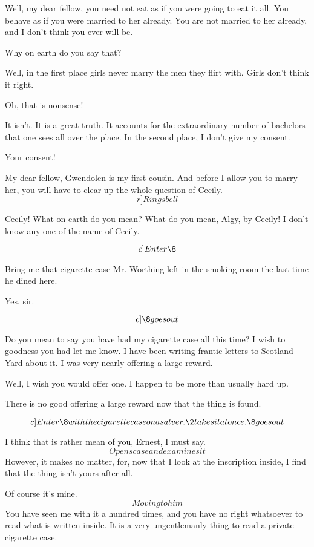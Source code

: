 \documentclass{book}
\begin{document}
\2  Well, my dear fellow, you need not eat as if you were
going to eat it all.  You behave as if you were married to her
already.  You are not married to her already, and I don't think you
ever will be.

\1  Why on earth do you say that?

\2  Well, in the first place girls never marry the men they
flirt with.  Girls don't think it right.

\1  Oh, that is nonsense!

\2  It isn't.  It is a great truth.  It accounts for the
extraordinary number of bachelors that one sees all over the place.
In the second place, I don't give my consent.

\1  Your consent!

\2  My dear fellow, Gwendolen is my first cousin.  And
before I allow you to marry her, you will have to clear up the
whole question of Cecily.  \[r]Rings bell\]

\1  Cecily!  What on earth do you mean?  What do you mean, Algy,
by Cecily!  I don't know any one of the name of Cecily.

\[c]Enter \8\]

\2  Bring me that cigarette case Mr. Worthing left in the
smoking-room the last time he dined here.

\8  Yes, sir.

\[c]\8 goes out\]

\1  Do you mean to say you have had my cigarette case all this
time?  I wish to goodness you had let me know.  I have been writing
frantic letters to Scotland Yard about it.  I was very nearly
offering a large reward.

\2  Well, I wish you would offer one.  I happen to be more
than usually hard up.

\1  There is no good offering a large reward now that the thing
is found.

\[c]Enter \8 with the cigarette case on a salver. \\\2 takes it
at once.  \8 goes out\]

\2  I think that is rather mean of you, Ernest, I must say.
\[Opens case and examines it\]  However, it makes no matter, for,
now that I look at the inscription inside, I find that the thing
isn't yours after all.

\1  Of course it's mine.  \[Moving to him\]  You have seen me
with it a hundred times, and you have no right whatsoever to read
what is written inside.  It is a very ungentlemanly thing to read a
private cigarette case.
\end{document}
